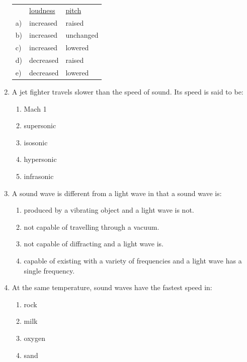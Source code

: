 \begin{eocexercises}{}
\begin{enumerate}
\begin{tabular}{lll}
& \underline{loudness} & \underline{pitch}\\
a) & increased & raised\\
b) & increased & unchanged\\
c) & increased & lowered\\
d) & decreased & raised\\
e) & decreased & lowered\\
\end{tabular}

\item A jet fighter travels slower than the speed of sound. Its speed is said to be:
\begin{enumerate}[label=\textbf{\alph*}.]
\item Mach 1
\item supersonic
\item isosonic
\item hypersonic
\item infrasonic
\end{enumerate}

\item A sound wave is different from a light wave in that a sound wave is:
\begin{enumerate}[label=\textbf{\alph*}.]
\item produced by a vibrating object and a light wave is not.
\item not capable of travelling through a vacuum.
\item not capable of diffracting and a light wave is.
\item capable of existing with a variety of frequencies and a light wave has a single frequency.
\end{enumerate}

\item At the same temperature, sound waves have the fastest speed in:
\begin{enumerate}[label=\textbf{\alph*}.]
\item{rock}
\item{milk}
\item{oxygen}
\item{sand}
\end{enumerate}


\end{enumerate}
\end{eocexercises}
